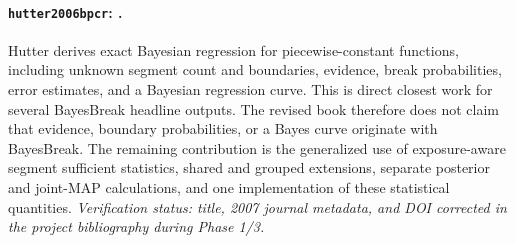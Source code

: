 
\paragraph{\texttt{hutter2006bpcr}: \citet{hutter2006bpcr}.}
Hutter derives exact Bayesian regression for piecewise-constant functions, including unknown segment count and boundaries, evidence, break probabilities, error estimates, and a Bayesian regression curve. This is direct closest work for several BayesBreak headline outputs. The revised book therefore does not claim that evidence, boundary probabilities, or a Bayes curve originate with BayesBreak. The remaining contribution is the generalized use of exposure-aware segment sufficient statistics, shared and grouped extensions, separate posterior and joint-MAP calculations, and one implementation of these statistical quantities. \textit{Verification status: title, 2007 journal metadata, and DOI corrected in the project bibliography during Phase 1/3.}
